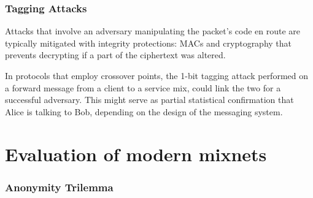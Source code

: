 \documentclass{article}
\begin{document}

\subsubsection{Tagging Attacks}

Attacks that involve an adversary manipulating the packet's code en route are typically mitigated with integrity protections: MACs and cryptography that prevents decrypting if a part of the ciphertext was altered.

In protocols that employ crossover points, the 1-bit tagging attack performed on a forward message from a client to a service mix, could link the two for a successful adversary. This might serve as partial statistical confirmation that Alice is talking to Bob, depending on the design of the messaging system. %
\section{Evaluation of modern mixnets}

\subsubsection{Anonymity Trilemma}
\end{document}
